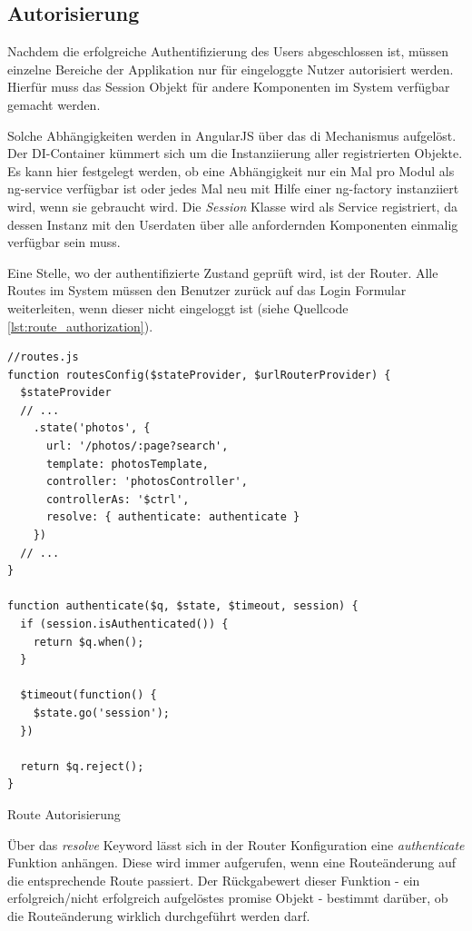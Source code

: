 \subsection{Autorisierung}

Nachdem die erfolgreiche Authentifizierung des Users abgeschlossen ist, müssen einzelne Bereiche der Applikation nur für eingeloggte Nutzer autorisiert werden. Hierfür muss das Session Objekt für andere Komponenten im System verfügbar gemacht werden.

Solche Abhängigkeiten werden in AngularJS über das \gls{di} Mechanismus aufgelöst. Der DI-Con­tai­ner kümmert sich um die Instanziierung aller registrierten Objekte. Es kann hier festgelegt werden, ob eine Abhängigkeit nur ein Mal pro Modul als \gls{ng-service} verfügbar ist oder jedes Mal neu mit Hilfe einer \gls{ng-factory} instanziiert wird, wenn sie gebraucht wird.
Die \emph{Session} Klasse wird als Service registriert, da dessen Instanz mit den Userdaten über alle anfordernden Komponenten einmalig verfügbar sein muss.

Eine Stelle, wo der authentifizierte Zustand geprüft wird, ist der Router. Alle Routes im System müssen den Benutzer zurück auf das Login Formular weiterleiten, wenn dieser nicht eingeloggt ist (siehe Quellcode \ref{lst:route_authorization}).

\begin{listing}[H]
\begin{verbatim}
//routes.js
function routesConfig($stateProvider, $urlRouterProvider) {
  $stateProvider
  // ...
    .state('photos', {
      url: '/photos/:page?search',
      template: photosTemplate,
      controller: 'photosController',
      controllerAs: '$ctrl',
      resolve: { authenticate: authenticate }
    })
  // ...
}

function authenticate($q, $state, $timeout, session) {
  if (session.isAuthenticated()) {
    return $q.when();
  }

  $timeout(function() {
    $state.go('session');
  })

  return $q.reject();
}

\end{verbatim}
\caption{Route Autorisierung}
\label{lst:route_authorization}
\end{listing}

Über das \emph{resolve} Keyword lässt sich in der Router Konfiguration eine \emph{authenticate} Funktion anhängen. Diese wird immer aufgerufen, wenn eine Routeänderung auf die entsprechende Route passiert. Der Rückgabewert dieser Funktion - ein erfolgreich/nicht erfolgreich aufgelöstes \gls{promise} Objekt - bestimmt darüber, ob die Routeänderung wirklich durchgeführt werden darf.

